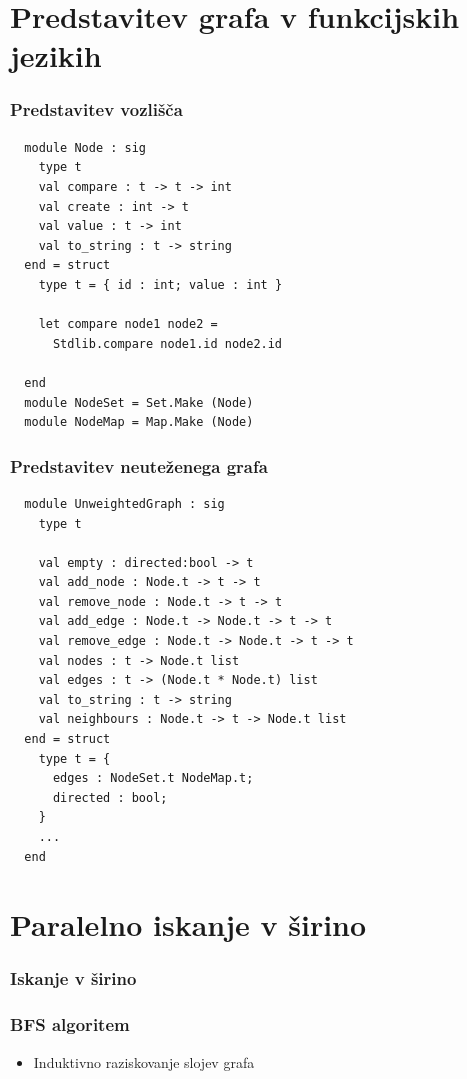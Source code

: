 \documentclass{beamer}
\begin{document}
\section{Predstavitev grafa v funkcijskih jezikih}

\begin{frame}[fragile]
  \frametitle{Predstavitev vozlišča}
  \begin{verbatim}
  module Node : sig
    type t
    val compare : t -> t -> int
    val create : int -> t
    val value : t -> int
    val to_string : t -> string
  end = struct
    type t = { id : int; value : int }
  
    let compare node1 node2 = 
      Stdlib.compare node1.id node2.id

  end
  module NodeSet = Set.Make (Node)
  module NodeMap = Map.Make (Node)
  \end{verbatim}
\end{frame}

\begin{frame}[fragile]
  \frametitle{Predstavitev neuteženega grafa}
  \begin{verbatim}
  module UnweightedGraph : sig
    type t
  
    val empty : directed:bool -> t
    val add_node : Node.t -> t -> t
    val remove_node : Node.t -> t -> t
    val add_edge : Node.t -> Node.t -> t -> t
    val remove_edge : Node.t -> Node.t -> t -> t
    val nodes : t -> Node.t list
    val edges : t -> (Node.t * Node.t) list
    val to_string : t -> string
    val neighbours : Node.t -> t -> Node.t list
  end = struct
    type t = {
      edges : NodeSet.t NodeMap.t;
      directed : bool;
    }
    ...
  end  
  \end{verbatim}
\end{frame}

\section{Paralelno iskanje v širino}

  \frametitle{Iskanje v širino}
  \begin{frame}
    \frametitle{BFS algoritem}
    \begin{figure}[h!]
      \centering

    \end{figure}

    \begin{itemize}
      \item Induktivno raziskovanje slojev grafa
    \end{itemize}
  \end{frame}
\end{document}
